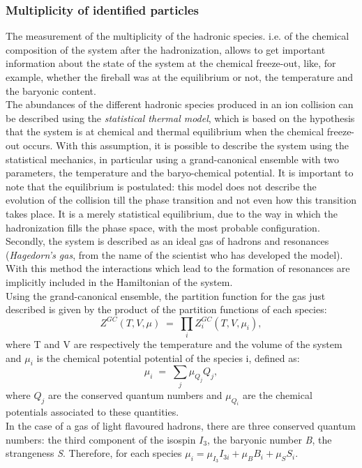 \subsubsection{Multiplicity of identified particles}
The measurement of the multiplicity of the hadronic species. i.e. of the chemical composition of the system after the hadronization, allows to get important information about the state of the system at the chemical freeze-out, like, for example, whether the fireball was at the equilibrium or not, the temperature and the baryonic content.\\
The abundances of the different hadronic species produced in an ion collision can be described using the \textit{statistical thermal model}, which is based on the hypothesis that the system is at chemical and thermal equilibrium when the chemical freeze-out occurs. With this assumption, it is possible to describe the system using the statistical mechanics, in particular using a grand-canonical ensemble with two parameters, the temperature and the baryo-chemical potential. It is important to note that the equilibrium is postulated: this model does not describe the evolution of the collision till the phase transition and not even how this transition takes place. It is a merely statistical equilibrium, due to the way in which the hadronization fills the phase space, with the most probable configuration. Secondly, the system is described as an ideal gas of hadrons and resonances (\textit{Hagedorn's gas}, from the name of the scientist who has developed the model). With this method the interactions which lead to the formation of resonances are implicitly included in the Hamiltonian of the system.\\
Using the grand-canonical ensemble, the partition function for the gas just described is given by the product of the partition functions of each species:
\begin{equation}
 Z^{GC}(T,V,\mu)\; = \;\prod_{i}Z^{GC}_{i}(T,V,\mu_{i}),
\end{equation}
where T and V are respectively the temperature and the volume of the system and $\mu_i$ is the chemical potential potential of the species i, defined as:
\begin{equation}
\mu_i \; = \;\sum_{j} \mu_{Q_{j}}Q_{j},
\end{equation}
where $Q_{j}$ are the conserved quantum numbers and $\mu_{Q_{i}}$ are the chemical potentials associated to these quantities.\\
In the case of a gas of light flavoured hadrons, there are three conserved quantum numbers: the third component of the isospin $I_{3}$, the baryonic number \textit{B}, the strangeness \textit{S}. Therefore, for each species $\mu_{i} = \mu_{I_{3}}I_{3i} + \mu_{B}B_{i} + \mu_{S}S_{i}$.
